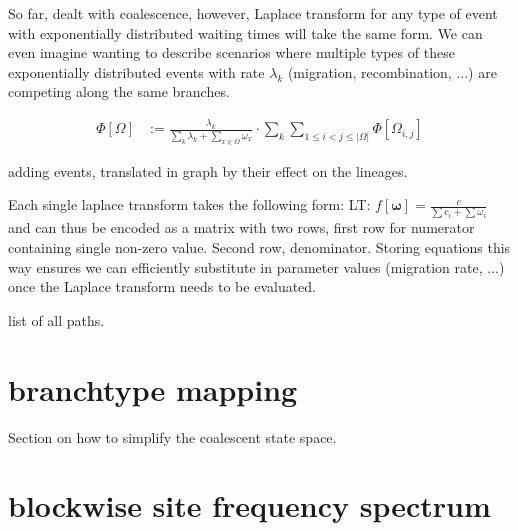 \documentclass[10pt, a4]{article}
\begin{document}
So far, dealt with coalescence, however, Laplace transform for any type of event with exponentially distributed waiting times will take the same form. We can even imagine wanting to describe scenarios where multiple types of these exponentially distributed events with rate $\lambda_k$ (migration, recombination, ...) are competing along the same branches.

 \begin{equation}\label{eq:recursion_all_events} 
 \begin{split}
         \Phi[\Omega] &:= \frac{\lambda_k}{\sum\limits_{k}\lambda_k+ \sum\limits_{x \in \Omega}\omega_x} \cdot \sum\limits_{k}\sum\limits_{1 \leq i < j \leq |\Omega|} \Phi[\Omega_{i,j}]
 \end{split}
 \end{equation}

adding events, translated in graph by their effect on the lineages.

%
Each single laplace transform takes the following form: LT: $f[\boldsymbol{\omega}] = \frac{c}{\sum c_i + \sum \omega_i}$ and can thus be encoded as a matrix with two rows, first row for numerator containing single non-zero value. Second row, denominator. Storing equations this way ensures we can efficiently substitute in parameter values (migration rate, ...) once the Laplace transform needs to be evaluated.

list of all paths.


\section{branchtype mapping}
Section on how to simplify the coalescent state space.

\section{blockwise site frequency spectrum}
\end{document}
